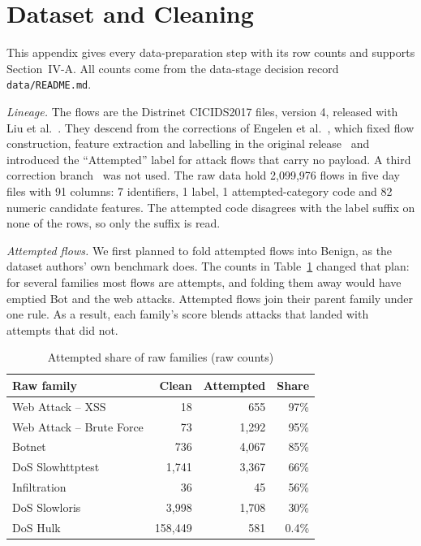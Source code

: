 
\section{Dataset and Cleaning}
\label{app:data}
This appendix gives every data-preparation step with its row counts and supports
Section~IV-A. All counts come from the data-stage decision record \texttt{data/README.md}.

\emph{Lineage.} The flows are the Distrinet CICIDS2017 files, version 4, released with %
Liu et al.~\cite{liu2022}. They descend from the corrections of Engelen et
al.~\cite{engelen2021}, which fixed flow construction, feature extraction and labelling
in the original release~\cite{sharafaldin2018} and introduced the ``Attempted'' label for
attack flows that carry no payload. A third correction branch~\cite{lanvin2023} was not
used. The raw data hold 2,099,976 flows in five day files with 91 columns: 7 identifiers, %
1 label, 1 attempted-category code and 82 numeric candidate features. The attempted %
code disagrees with the label suffix on none of the rows, so only the suffix is read.

\emph{Attempted flows.} We first planned to fold attempted flows into Benign, as the
dataset authors' own benchmark does. The counts in Table~\ref{tab:attempted} changed that
plan: for several families most flows are attempts, and folding them away would have
emptied Bot and the web attacks. Attempted flows join their parent family under one rule.
As a result, each family's score blends attacks that landed with attempts that did not.

\begin{table}[h]
\centering
\caption{Attempted share of raw families (raw counts)}
\label{tab:attempted}
\footnotesize
\begin{tabular}{@{}lrrr@{}}
\toprule
Raw family & Clean & Attempted & Share\\
\midrule
Web Attack -- XSS & 18 & 655 & 97\%\\ %
Web Attack -- Brute Force & 73 & 1,292 & 95\%\\ %
Botnet & 736 & 4,067 & 85\%\\ %
DoS Slowhttptest & 1,741 & 3,367 & 66\%\\ %
Infiltration & 36 & 45 & 56\%\\ %
DoS Slowloris & 3,998 & 1,708 & 30\%\\ %
DoS Hulk & 158,449 & 581 & 0.4\%\\ %
\bottomrule
\end{tabular}
\end{table}

